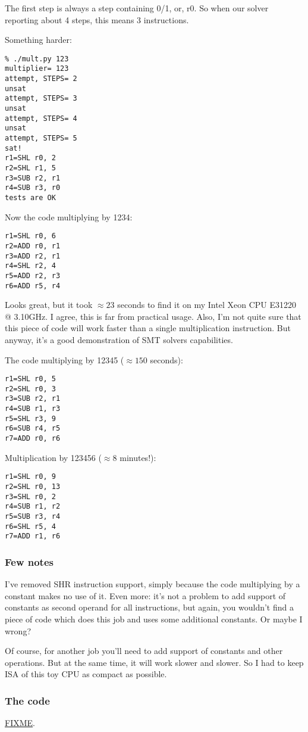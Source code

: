 The first step is always a step containing 0/1, or, r0.
So when our solver reporting about 4 steps, this means 3 instructions.

Something harder:

\begin{lstlisting}
% ./mult.py 123
multiplier= 123
attempt, STEPS= 2
unsat
attempt, STEPS= 3
unsat
attempt, STEPS= 4
unsat
attempt, STEPS= 5
sat!
r1=SHL r0, 2
r2=SHL r1, 5
r3=SUB r2, r1
r4=SUB r3, r0
tests are OK
\end{lstlisting}

Now the code multiplying by 1234:

\begin{lstlisting}
r1=SHL r0, 6
r2=ADD r0, r1
r3=ADD r2, r1
r4=SHL r2, 4
r5=ADD r2, r3
r6=ADD r5, r4
\end{lstlisting}

Looks great, but it took $\approx 23$ seconds to find it on my Intel Xeon CPU E31220 @ 3.10GHz.
I agree, this is far from practical usage.
Also, I'm not quite sure that this piece of code will work faster than a single multiplication instruction.
But anyway, it's a good demonstration of SMT solvers capabilities.

The code multiplying by 12345 ($\approx 150$ seconds):

\begin{lstlisting}
r1=SHL r0, 5
r2=SHL r0, 3
r3=SUB r2, r1
r4=SUB r1, r3
r5=SHL r3, 9
r6=SUB r4, r5
r7=ADD r0, r6
\end{lstlisting}

Multiplication by 123456 ($\approx 8$ minutes!):

\begin{lstlisting}
r1=SHL r0, 9
r2=SHL r0, 13
r3=SHL r0, 2
r4=SUB r1, r2
r5=SUB r3, r4
r6=SHL r5, 4
r7=ADD r1, r6
\end{lstlisting}

\subsubsection{Few notes}

I've removed SHR instruction support, simply because the code multiplying by a constant makes no use of it.
Even more: it's not a problem to add support of constants as second operand for all instructions,
but again, you wouldn't find a piece of code which does this job and uses some additional constants.
Or maybe I wrong?

Of course, for another job you'll need to add support of constants and other operations.
But at the same time, it will work slower and slower.
So I had to keep \ac{ISA} of this toy \ac{CPU} as compact as possible.

\subsubsection{The code}

\url{FIXME}.

